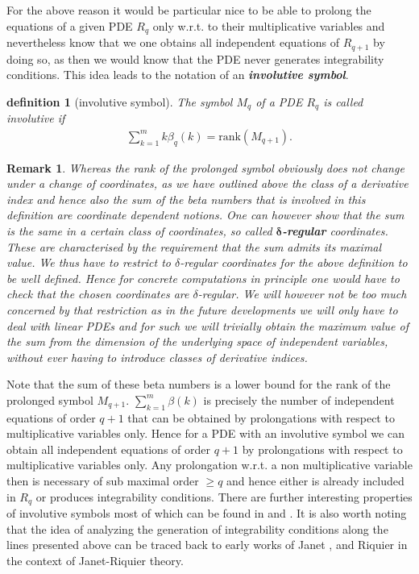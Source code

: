 \documentclass[a4paper,12pt, DIV=14, BCOR=5mm, twoside, headsepline]{scrbook}
\newtheorem{definition}{definition}[section]
\newtheorem*{remark}{Remark}
\begin{document}
For the above reason it would be particular nice to be able to prolong the equations of a given PDE $R_q$ only w.r.t. to their multiplicative variables and nevertheless know that we one obtains all independent equations of $R_{q+1}$ by doing so, as then we would know that the PDE never generates integrability conditions. This idea leads to the notation of an \textit{\textbf{involutive symbol}}. 
\begin{definition}[involutive symbol]
The symbol $M_q$ of a PDE $R_q$ is called involutive if 
\begin{align}\label{sumBeta}
    \sum_{k=1}^m k\beta_q(k) = \mathrm{rank}(M_{q+1}).
\end{align}
\end{definition}
\begin{remark}
Whereas the rank of the prolonged symbol obviously does not change under a change of coordinates,
as we have outlined above the class of a derivative index and hence also the sum of the beta numbers that is involved in this definition are coordinate dependent notions. One can however show that the sum is the same in a certain class of coordinates, so called \textit{\textbf{$\boldsymbol{\delta}$-regular}} coordinates. These are characterised by the requirement that the sum admits its maximal value.
We thus have to restrict to $\delta$-regular coordinates for the above definition to be well defined.
Hence for concrete computations in principle one would have to check that the chosen coordinates are $\delta$-regular.  We will however not be too much concerned by that restriction as in the future developments we will only have to deal with linear PDEs and for such we will trivially obtain the maximum value of the sum from the dimension of the underlying space of independent variables, without ever having to introduce classes of derivative indices.
\end{remark}
Note that the sum of these beta numbers is a lower bound for the rank of the prolonged symbol $M_{q+1}$. $\sum_{k=1}^m \beta(k)$ is precisely the number of independent equations of order $q+1$ that can be obtained by prolongations with respect to multiplicative variables only.  
Hence for a PDE with an involutive symbol we can obtain all independent equations of order $q+1$ by prolongations with respect to multiplicative variables only. Any prolongation w.r.t. a non multiplicative variable then is necessary of sub maximal order $\geq q$ and hence either is already included in $R_q$ or produces integrability conditions. There are further interesting properties of involutive symbols most of which can be found in \cite{seiler2009involution} and \cite{seiler2009involution}. It is also worth noting that the idea of analyzing the generation of integrability conditions along the lines presented above can be traced back to early works of Janet \cite{janet1920systemes}, \cite{MSM_1927__21__1_0} and Riquier \cite{bateman_1910} in the context of Janet-Riquier theory.
\end{document}
